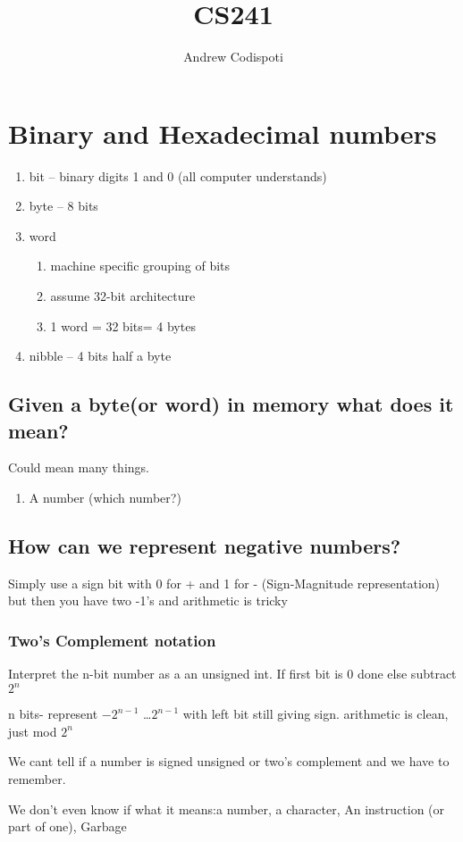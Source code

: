\documentclass[11pt]{amsart}
\title{CS241}
\author{Andrew Codispoti}
\begin{document}
\maketitle
\section{Binary and Hexadecimal numbers}
\begin{enumerate}
  \item bit -- binary digits 1 and 0 (all computer understands)
  \item byte -- 8 bits
  \item word
    \begin{enumerate}
      \item machine specific grouping of bits
      \item assume 32-bit architecture
      \item 1 word = 32 bits= 4 bytes
    \end{enumerate}

  \item nibble -- 4 bits half a byte
\end{enumerate}


\subsection{Given a byte(or word) in memory what does it mean?}
\par Could mean many things.
\begin{enumerate}
  \item A number (which number?)
\end{enumerate}
\subsection{How can we represent negative numbers?}
\par Simply use a sign bit with 0 for + and 1 for - (Sign-Magnitude
representation) but then you have two -1's and arithmetic is tricky
\subsubsection{Two's Complement notation}
\par Interpret the n-bit number as a an unsigned int. If first bit is 0 done else
subtract $2^n$
\par n bits- represent $-2^{n-1}$ \dots $2^{n-1}$ with left bit still giving
sign. arithmetic is clean, just mod $2^n$
\par We cant tell if a number is signed unsigned or two's complement and we
have to remember.
\par We don't even know if what it means:a number, a character, An
instruction (or part of one), Garbage
\end{document}
